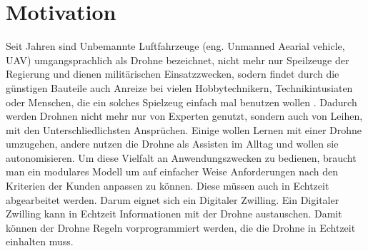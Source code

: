 \section{Motivation}

Seit Jahren sind Unbemannte Luftfahrzeuge (eng. Unmanned Aearial vehicle, UAV) umgangsprachlich als Drohne bezeichnet, nicht mehr nur Speilzeuge der Regierung und dienen militärischen Einsatzzwecken, sodern findet durch die günstigen Bauteile auch Anreize bei vielen Hobbytechnikern, Technikintusiaten oder Menschen, die ein solches Spielzeug einfach mal benutzen wollen \cite{Gadiraju2021Understanding}. Dadurch werden Drohnen nicht mehr nur von Experten genutzt, sondern auch von Leihen, mit den Unterschliedlichsten Ansprüchen. Einige wollen Lernen mit einer Drohne umzugehen, andere nutzen die Drohne als Assisten im Alltag und wollen sie autonomisieren. Um diese Vielfalt an Anwendungszwecken zu bedienen, braucht man ein modulares Modell um auf einfacher Weise Anforderungen nach den Kriterien der Kunden anpassen zu können. Diese müssen auch in Echtzeit abgearbeitet werden. Darum eignet sich ein Digitaler Zwilling. Ein Digitaler Zwilling kann in Echtzeit Informationen mit der Drohne austauschen. Damit können der Drohne Regeln vorprogrammiert werden, die die Drohne in Echtzeit einhalten muss. 